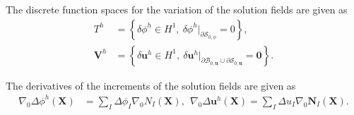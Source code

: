 \noindent The discrete function spaces for the variation of the solution fields are given as
\begin{align}
T^h &= \left\lbrace \delta\phi^h \in H^1, \ \delta\phi^h|_{\partial \mathcal{S}_{0, \phi}} = 0 \right\rbrace, \\
\mathbf{V}^h &= \left\lbrace \delta\mathbf{u}^h \in H^1, \ \delta\mathbf{u}^h|_{\partial \mathcal{B}_{0, \mathbf{u}} \cup \partial \mathcal{S}_{0, \mathbf{u}}} = \mathbf{0} \right\rbrace.
\end{align}

\noindent The derivatives of the increments of the solution fields are given as
\begin{align}
\nabla_0 \Delta \phi^h (\mathbf{X}) &= \sum\limits_{I} \Delta \phi_I \nabla_0 N_I (\mathbf{X}), \ \ \nabla_0 \Delta \mathbf{u}^h (\mathbf{X}) = \sum\limits_{I} \Delta u_I \nabla_0 \mathbf{N}_I (\mathbf{X}).
\end{align} \newline

